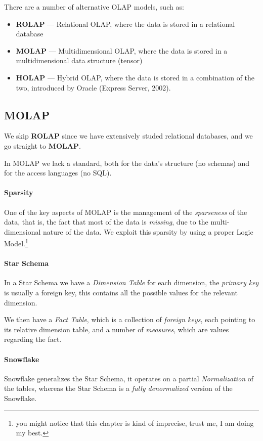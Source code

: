 \documentclass[openright, twoside, twocolumn, a4paper, 10pt]{report}
\begin{document}
There are a number of alternative OLAP models, such as:

\begin{itemize}
	\item \textbf{ROLAP} --- Relational OLAP, where the data is stored in a relational database
	\item \textbf{MOLAP} --- Multidimensional OLAP, where the data is stored in a multidimensional data structure (tensor)
	\item \textbf{HOLAP} --- Hybrid OLAP, where the data is stored in a combination of the two,
	      introduced by Oracle (Express Server, 2002).
\end{itemize}

\subsection{MOLAP}
We skip \textbf{ROLAP} since we have extensively studed relational databases, and we
go straight to \textbf{MOLAP}.

In MOLAP we lack a standard, both for the data's structure (no schemas) and
for the access languages (no SQL).

\paragraph{Sparsity}
One of the key aspects of MOLAP is the management of the \emph{sparseness} of the data,
that is, the fact that most of the data is \emph{missing}, due to the multi-dimensional
nature of the data. We exploit this sparsity by using a proper Logic Model.\footnote{
	you might notice that this chapter is kind of imprecise, trust me, I am doing my best.
}

\paragraph{Star Schema}
In a Star Schema we have a \emph{Dimension Table} for each dimension, the \emph{primary key}
is usually a foreign key, this contains all the possible values for the relevant dimension.

We then have a \emph{Fact Table}, which is a collection of \emph{foreign keys}, each
pointing to its relative dimension table, and a number of \emph{measures}, which are
values regarding the fact.

\paragraph{Snowflake}
Snowflake generalizes the Star Schema, it operates on a partial \emph{Normalization} of
the tables, whereas the Star Schema is a \emph{fully denormalized} version of the Snowflake.
\end{document}
